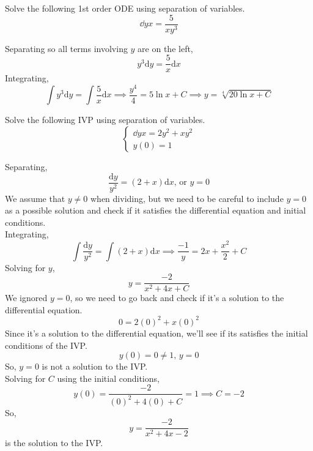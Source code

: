 \begin{example}
	Solve the following 1st order ODE using separation of variables.
	\begin{equation*}
		\dd{y}{x} = \frac{5}{xy^3}
	\end{equation*}
\end{example}
\noindent
Separating so all terms involving $y$ are on the left,
\begin{equation*}
	y^3 \mathrm{d}y = \frac{5}{x} \mathrm{d}x
\end{equation*}
Integrating,
\begin{equation*}
	\int{y^3 \mathrm{d}y} = \int{\frac{5}{x} \mathrm{d}x} \implies \frac{y^4}{4} = 5\ln{x} + C \implies y = \sqrt[4]{20\ln{x} + C}
\end{equation*}

\begin{example}
	Solve the following IVP using separation of variables.
	\begin{equation*}
		\begin{cases}
			\dd{y}{x} = 2y^2 + xy^2 \\
			y(0) = 1
		\end{cases}
	\end{equation*}
\end{example}
\noindent
Separating,
\begin{equation*}
	\frac{\mathrm{d}y}{y^2} = \left(2 + x\right) \mathrm{d}x \text{, or } y = 0
\end{equation*}
We assume that $y \neq 0$ when dividing, but we need to be careful to include $y = 0$ as a possible solution and check if it satisfies the differential equation and initial conditions.\\

\noindent
Integrating,
\begin{equation*}
	\int{\frac{\mathrm{d}y}{y^2}} = \int{\left(2 + x\right) \mathrm{d}x} \implies \frac{-1}{y} = 2x + \frac{x^2}{2} + C
\end{equation*}
Solving for $y$,
\begin{equation*}
	y = \frac{-2}{x^2 + 4x + C}
\end{equation*}
We ignored $y = 0$, so we need to go back and check if it's a solution to the differential equation.
\begin{equation*}
	0 = 2(0)^2 + x(0)^2
\end{equation*}
Since it's a solution to the differential equation, we'll see if its satisfies the initial conditions of the IVP.
\begin{equation*}
	y(0) = 0 \neq 1 \text{, } y = 0
\end{equation*}
So, $y = 0$ is not a solution to the IVP.\\

\noindent
Solving for $C$ using the initial conditions,
\begin{equation*}
	y(0) = \frac{-2}{(0)^2 + 4(0) + C} = 1 \implies C = -2
\end{equation*}
So,
\begin{equation*}
	y = \frac{-2}{x^2 + 4x -2}
\end{equation*}
is the solution to the IVP.